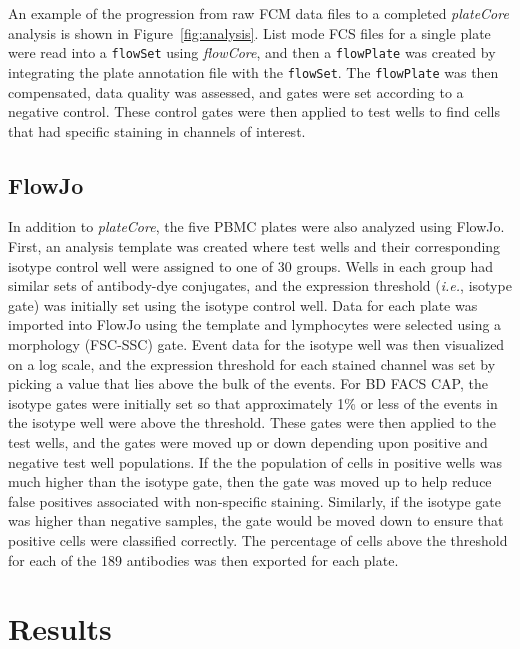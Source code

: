 \documentclass[12pt]{article}
\newcommand{\Robject}[1]{{\texttt{#1}}}
\newcommand{\Rpackage}[1]{{\textit{#1}}}
\begin{document}
An example of the progression from raw FCM data files to a completed
\Rpackage{plateCore} analysis is shown in Figure~\ref{fig:analysis}. List mode
FCS files for a single plate were read into a \Robject{flowSet} using
\Rpackage{flowCore}, and then a \Robject{flowPlate} was created by integrating
the plate annotation file with the \Robject{flowSet}. The \Robject{flowPlate}
was then compensated, data quality was assessed, and gates were set according
to a negative control. These control gates were then applied to test wells to
find cells that had specific staining in channels of interest.


\subsection*{FlowJo}

In addition to \Rpackage{plateCore}, the five PBMC plates were also analyzed
using FlowJo. First, an analysis template was created where test wells and
their corresponding isotype control well were assigned to one of 30 groups.
Wells in each group had similar sets of antibody-dye conjugates, and
the expression threshold (\emph{i.e.}, isotype gate) was initially set using
the isotype control well. Data for each plate was imported into FlowJo using
the template and lymphocytes were selected using a morphology (FSC-SSC) gate.
Event data for the isotype well was then visualized on a log scale, and the
expression threshold for each stained channel was set by picking a value that
lies above the bulk of the events. For BD FACS CAP, the isotype gates were
initially set so that approximately 1\% or less of the events in the isotype
well were above the threshold. These gates were then applied to the test wells,
and the gates were moved up or down depending upon positive and negative test
well populations. If the the population of cells in positive wells was much
higher than the isotype gate, then the gate was moved up to help reduce false
positives associated with non-specific staining.  Similarly, if the isotype
gate was higher than negative samples, the gate would be moved down to ensure
that positive cells were classified correctly. The percentage of cells above
the threshold for each of the 189 antibodies was then exported for each plate.

\section*{Results}
\end{document}
